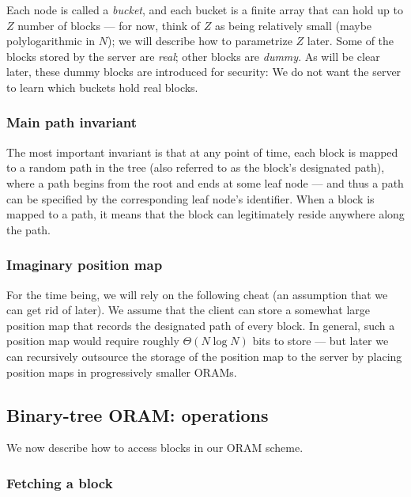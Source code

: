 Each node is called a \emph{bucket}, and each bucket is a finite array
that can hold up to \(Z\) number of blocks --- for now, think of \(Z\)
as being relatively small (maybe polylogarithmic in \(N\)); we will
describe how to parametrize \(Z\) later. Some of the blocks stored by
the server are \emph{real}; other blocks are \emph{dummy}. As will be
clear later, these dummy blocks are introduced for security: We do not
want the server to learn which buckets hold real blocks.

\subsubsection{Main path invariant}\label{main-path-invariant.}

The most important invariant is that at any point of time, each block is
mapped to a random path in the tree (also referred to as the block's
designated path), where a path begins from the root and ends at some
leaf node --- and thus a path can be specified by the corresponding leaf
node's identifier. When a block is mapped to a path, it means that the
block can legitimately reside anywhere along the path.

\subsubsection{Imaginary position map}\label{imaginary-position-map.}

For the time being, we will rely on the following cheat (an assumption
that we can get rid of later). We assume that the client can store a
somewhat large position map that records the designated path of every
block. In general, such a position map would require roughly
\(\Theta( N\log N )\) bits to store --- but later we can
recursively outsource the storage of the position map to the server by
placing position maps in progressively smaller ORAMs.

\subsection{Binary-tree ORAM: operations}\label{operations}

We now describe how to access blocks in our ORAM scheme.

\subsubsection{Fetching a block}\label{fetching-a-block.}

